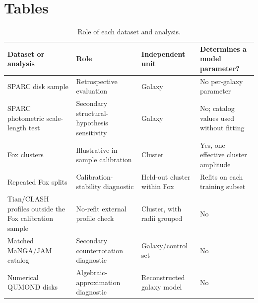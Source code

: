 \documentclass[utf8]{FrontiersinHarvard}
\begin{document}



\section*{Tables}

\begin{table}[h!]
\centering
\caption{Role of each dataset and analysis.}\label{tab:roles}
\scriptsize
\begin{tabularx}{\textwidth}{>{\raggedright\arraybackslash}p{}>{\raggedright\arraybackslash}p{}>{\raggedright\arraybackslash}p{}>{\raggedright\arraybackslash}X}
\toprule
Dataset or analysis & Role & Independent unit & Determines a model parameter? \\
\midrule
SPARC disk sample & Retrospective evaluation & Galaxy & No per-galaxy parameter \\
SPARC photometric scale-length test & Secondary structural-hypothesis sensitivity & Galaxy & No; catalog values used without fitting \\
Fox clusters & Illustrative in-sample calibration & Cluster & Yes, one effective cluster amplitude \\
Repeated Fox splits & Calibration-stability diagnostic & Held-out cluster within Fox & Refits on each training subset \\
Tian/CLASH profiles outside the Fox calibration sample & No-refit external profile check & Cluster, with radii grouped & No \\
Matched MaNGA/JAM catalog & Secondary counterrotation diagnostic & Galaxy/control set & No \\
Numerical QUMOND disks & Algebraic-approximation diagnostic & Reconstructed galaxy model & No \\
\bottomrule
\end{tabularx}
\end{table}
\end{document}
